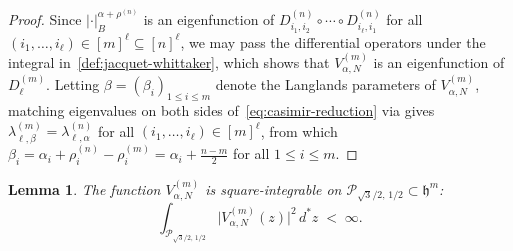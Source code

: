 \documentclass[12pt, reqno, oneside]{amsart}
\newtheorem{lemma}[theorem]{Lemma}
\theoremstyle{definition}
\numberwithin{equation}{section}
\newcommand{\hh}{\mathfrak{h}}
\begin{document}
\begin{proof}
Since $|\cdot|_B^{\alpha+\rho^{(n)}}$ is an eigenfunction of
$D_{i_1,i_2}^{(n)}\circ\cdots\circ D_{i_\ell,i_1}^{(n)}$ for all
$(i_1,\ldots,i_\ell)\in[m]^\ell\subseteq[n]^\ell$, we may pass the
differential operators under the integral in~\eqref{def:jacquet-whittaker},
which shows that $V_{\alpha,N}^{(m)}$ is an eigenfunction of $D_\ell^{(m)}$.
Letting $\beta=(\beta_i)_{1\leq i\leq m}$ denote the Langlands parameters
of $V_{\alpha,N}^{(m)}$, matching eigenvalues on both sides
of~\eqref{eq:casimir-reduction} via \cite[Theorem 1.5]{Mut26} gives
$\lambda_{\ell,\beta}^{(m)}=\lambda_{\ell,\alpha}^{(n)}$ for all $(i_1,\ldots,i_\ell)\in[m]^\ell$,
from which $\beta_i=\alpha_i+\rho_i^{(n)}-\rho_i^{(m)}=\alpha_i+\frac{n-m}{2}$
for all $1\leq i\leq m$.
\end{proof}

\begin{lemma}\label{lem:square-int}
The function $V_{\alpha,N}^{(m)}$ is square-integrable on
$\mathcal{P}_{\!\sqrt{3}/2,\,1/2}\subset\hh^m$:
\[
  \int_{\mathcal{P}_{\!\sqrt{3}/2,\,1/2}}
  \bigl|V_{\alpha,N}^{(m)}(z)\bigr|^2\,d^*z \;<\; \infty.
\]
\end{lemma}
\end{document}

